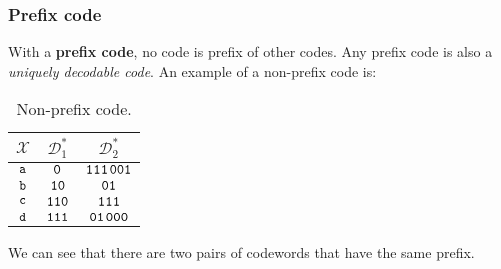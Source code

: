 \subsubsection{Prefix code}
With a \textbf{prefix code}, no code is prefix of other codes. Any prefix code is also a \textit{uniquely decodable code}.
An example of a non-prefix code is:
\begin{table}[H]
	\centering
	\begin{tabular}{| c | c | c |}
		\hline
		$\mathcal{X}$ & $\mathcal{D}^*_1$ & $\mathcal{D}^*_2$\\\hline
		$\verb|a|$ & $\verb|0|$ & {\color{red}$\verb|111|$}$\verb|001|$ \\
		$\verb|b|$ & $\verb|10|$ & {\color{blue}$\verb|01|$} \\
		$\verb|c|$ & $\verb|110|$ & {\color{red}$\verb|111|$} \\
		$\verb|d|$ & $\verb|111|$ & {\color{blue}$\verb|01|$}$\verb|000|$ \\
		\hline
	\end{tabular}
	\caption{Non-prefix code.}
\end{table}
\par
We can see that there are two pairs of codewords that have the same prefix. 

